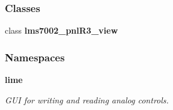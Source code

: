 \subsubsection*{Classes}
\begin{DoxyCompactItemize}
\item 
class {\bf lms7002\+\_\+pnl\+R3\+\_\+view}
\end{DoxyCompactItemize}
\subsubsection*{Namespaces}
\begin{DoxyCompactItemize}
\item 
 {\bf lime}
\begin{DoxyCompactList}\small\item\em G\+UI for writing and reading analog controls. \end{DoxyCompactList}\end{DoxyCompactItemize}
